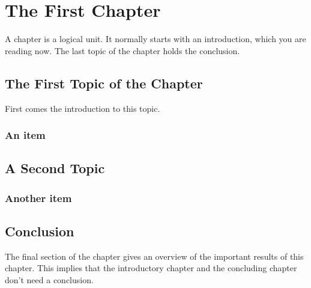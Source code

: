 \chapter{The First Chapter}\label{cha:1}
A chapter is a logical unit. It normally starts with an introduction, which
you are reading now. The last topic of the chapter holds the conclusion.

\section{The First Topic of the Chapter}
First comes the introduction to this topic.

\subsection{An item}

\section{A Second Topic}

\subsection{Another item}

\section{Conclusion}
The final section of the chapter gives an overview of the important results
of this chapter. This implies that the introductory chapter and the
concluding chapter don't need a conclusion.
